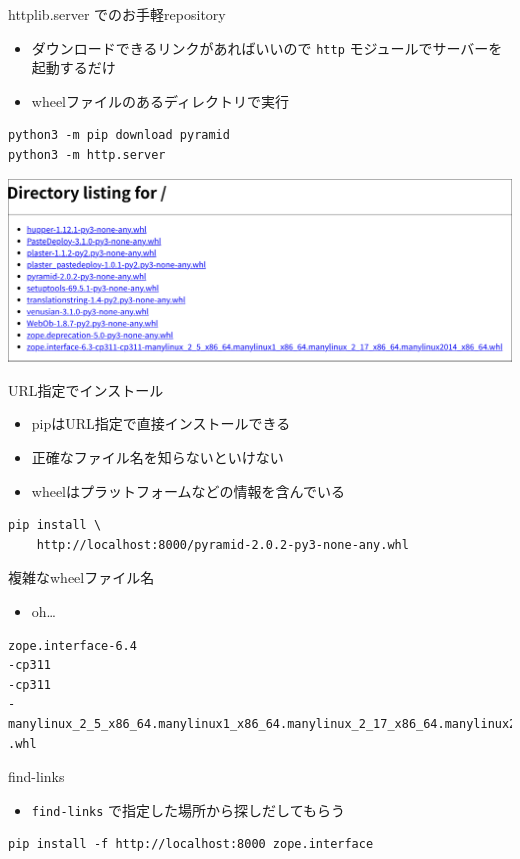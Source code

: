\documentclass[presentation]{beamer}
\begin{document}
\begin{frame}[label={sec:orgebf9f5e},fragile]{httplib.server でのお手軽repository}
 \begin{itemize}
\item ダウンロードできるリンクがあればいいので \texttt{http} モジュールでサーバーを起動するだけ
\item wheelファイルのあるディレクトリで実行
\end{itemize}

\begin{verbatim}
python3 -m pip download pyramid
python3 -m http.server
\end{verbatim}

\begin{center}
\includegraphics[width=.9\linewidth]{./http-server-simple-repository.png}
\end{center}
\end{frame}

\begin{frame}[label={sec:orge0dfa75},fragile]{URL指定でインストール}
 \begin{itemize}
\item pipはURL指定で直接インストールできる
\item 正確なファイル名を知らないといけない
\item wheelはプラットフォームなどの情報を含んでいる
\end{itemize}

\begin{verbatim}
pip install \
    http://localhost:8000/pyramid-2.0.2-py3-none-any.whl
\end{verbatim}
\end{frame}

\begin{frame}[label={sec:org1deb214},fragile]{複雑なwheelファイル名}
 \begin{itemize}
\item oh\ldots{}
\end{itemize}
\begin{verbatim}
zope.interface-6.4
-cp311
-cp311
-manylinux_2_5_x86_64.manylinux1_x86_64.manylinux_2_17_x86_64.manylinux2014_x86_64
.whl
\end{verbatim}
\end{frame}
\begin{frame}[label={sec:orgbb43150},fragile]{find-links}
 \begin{itemize}
\item \texttt{find-links} で指定した場所から探しだしてもらう
\end{itemize}
\begin{verbatim}
pip install -f http://localhost:8000 zope.interface
\end{verbatim}
\end{frame}
\end{document}
